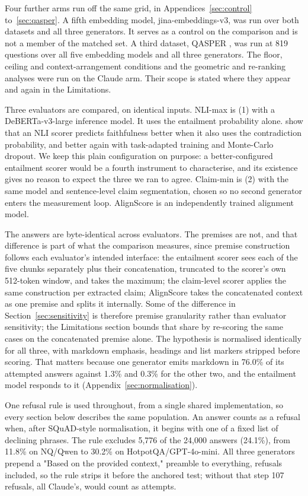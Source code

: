 \documentclass[11pt]{article}
\begin{document}
Four further arms run off the same grid, in Appendices~\ref{sec:control} to~\ref{sec:qasper}. A fifth embedding model, jina-embeddings-v3, was run over both datasets and all three generators. It serves as a control on the comparison and is not a member of the matched set. A third dataset, QASPER \citep{dasigi-etal-2021}, was run at 819 questions over all five embedding models and all three generators. The floor, ceiling and context-arrangement conditions and the geometric and re-ranking analyses were run on the Claude arm. Their scope is stated where they appear and again in the Limitations.

Three evaluators are compared, on identical inputs. NLI-max is (1) with a DeBERTa-v3-large \citep{he-etal-2023} inference model. It uses the entailment probability alone. \citet{steen-etal-2023} show that an NLI scorer predicts faithfulness better when it also uses the contradiction probability, and better again with task-adapted training and Monte-Carlo dropout. We keep this plain configuration on purpose: a better-configured entailment scorer would be a fourth instrument to characterise, and its existence gives no reason to expect the three we ran to agree. Claim-min is (2) with the same model and sentence-level claim segmentation, chosen so no second generator enters the measurement loop. AlignScore \citep{zha-etal-2023} is an independently trained alignment model.

The answers are byte-identical across evaluators. The premises are not, and that difference is part of what the comparison measures, since premise construction follows each evaluator's intended interface: the entailment scorer sees each of the five chunks separately plus their concatenation, truncated to the scorer's own 512-token window, and takes the maximum; the claim-level scorer applies the same construction per extracted claim; AlignScore takes the concatenated context as one premise and splits it internally. Some of the difference in Section~\ref{sec:sensitivity} is therefore premise granularity rather than evaluator sensitivity; the Limitations section bounds that share by re-scoring the same cases on the concatenated premise alone. The hypothesis is normalised identically for all three, with markdown emphasis, headings and list markers stripped before scoring. That matters because one generator emits markdown in 76.0\% of its attempted answers against 1.3\% and 0.3\% for the other two, and the entailment model responds to it (Appendix~\ref{sec:normalisation}).

One refusal rule is used throughout, from a single shared implementation, so every section below describes the same population. An answer counts as a refusal when, after SQuAD-style normalisation, it begins with one of a fixed list of declining phrases. The rule excludes 5,776 of the 24,000 answers (24.1\%), from 11.8\% on NQ/Qwen to 30.2\% on HotpotQA/GPT-4o-mini. All three generators prepend a "Based on the provided context," preamble to everything, refusals included, so the rule strips it before the anchored test; without that step 107 refusals, all Claude's, would count as attempts.
\end{document}
